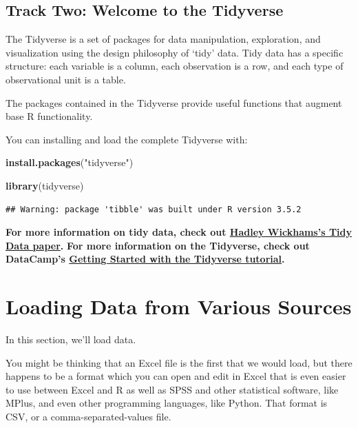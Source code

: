\documentclass[]{book}
\newenvironment{Shaded}{\begin{snugshade}}{\end{snugshade}}
\newcommand{\KeywordTok}[1]{\textcolor[rgb]{0.13,0.29,0.53}{\textbf{#1}}}
\newcommand{\StringTok}[1]{\textcolor[rgb]{0.31,0.60,0.02}{#1}}
\newcommand{\NormalTok}[1]{#1}
\begin{document}
\subsection{Track Two: Welcome to the
Tidyverse}\label{track-two-welcome-to-the-tidyverse}

The Tidyverse is a set of packages for data manipulation, exploration,
and visualization using the design philosophy of `tidy' data. Tidy data
has a specific structure: each variable is a column, each observation is
a row, and each type of observational unit is a table.

The packages contained in the Tidyverse provide useful functions that
augment base R functionality.

You can installing and load the complete Tidyverse with:

\begin{Shaded}
\begin{Highlighting}[]
\KeywordTok{install.packages}\NormalTok{(}\StringTok{"tidyverse"}\NormalTok{)}
\end{Highlighting}
\end{Shaded}

\begin{Shaded}
\begin{Highlighting}[]
\KeywordTok{library}\NormalTok{(tidyverse)}
\end{Highlighting}
\end{Shaded}

\begin{verbatim}
## Warning: package 'tibble' was built under R version 3.5.2
\end{verbatim}

\textbf{For more information on tidy data, check out
\href{http://vita.had.co.nz/papers/tidy-data.html}{Hadley Wickhams's
Tidy Data paper}.} \textbf{For more information on the Tidyverse, check
out DataCamp's
\href{https://www.datacamp.com/community/tutorials/tidyverse-tutorial-r}{Getting
Started with the Tidyverse tutorial}.}

\section{Loading Data from Various
Sources}\label{loading-data-from-various-sources}

In this section, we'll load data.

You might be thinking that an Excel file is the first that we would
load, but there happens to be a format which you can open and edit in
Excel that is even easier to use between Excel and R as well as SPSS and
other statistical software, like MPlus, and even other programming
languages, like Python. That format is CSV, or a comma-separated-values
file.
\end{document}

